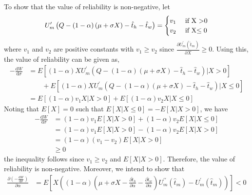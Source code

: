 \documentclass[12pt,a4paper,british]{article}
\makeatletter
\newenvironment{proof}[1][\proofname]{\par
    \normalfont\topsep6\p@\@plus6\p@\relax
    \trivlist
    \itemindent\parindent
    \item[\hskip\labelsep
          \scshape
      #1]\ignorespaces
  }{%
    \endtrivlist\@endpefalse
  }
\providecommand{\proofname}{Proof}
\makeatother
\begin{document}
\begin{proof}
To show that the value of reliability is non-negative, let
\begin{equation*}
U_{m}^{\prime}\left(Q-\left(1-\alpha\right)\left(\mu+\sigma X\right)-\hat{t}_{h}-\hat{t}_{w}\right)=\begin{cases}
v_{1} & \mbox{ if X >0}\\
v_{2} & \mbox{ if X\ensuremath{\leq0}}
\end{cases}
\end{equation*}%
where $v_{1}$ and $v_{2}$ are positive constants with $v_{1}\geq v_{2}$ since $\frac{\partial U_{m}^{\prime}\left(\hat{t}_{m}\right)}{\partial X} \geq 0$. Using this, the value of reliability can be given as,%
\begin{align*}
-\frac{\mathrm{d}W}{\mathrm{d}\sigma} & =E\left[\left(1-\alpha\right)XU_{m}^{\prime}\left(Q-\left(1-\alpha\right)\left(\mu+\sigma X\right)-\hat{t}_{h}-\hat{t}_{w}\right)\vert X>0\right]\\
 & \qquad+E\left[\left(1-\alpha\right)XU_{m}^{\prime}\left(Q-\left(1-\alpha\right)\left(\mu+\sigma X\right)-\hat{t}_{h}-\hat{t}_{w}\right)\vert X\leq0\right]\\
 & =E\left[\left(1-\alpha\right)v_{1}X\vert X>0\right]+E\left[\left(1-\alpha\right)v_{2}X\vert X\leq0\right]
\end{align*}%
Noting that $E\left[X\right]=0$ such that $E\left[X\vert X\leq0\right]=-E\left[X\vert X>0\right]$, we have
\begin{align*}
-\frac{\mathrm{d}W}{\mathrm{d}\sigma} & =\left(1-\alpha\right)v_{1}E\left[X\vert X>0\right]+\left(1-\alpha\right)v_{2}E\left[X\vert X\leq0\right]\\
 & =\left(1-\alpha\right)v_{1}E\left[X\vert X>0\right]-\left(1-\alpha\right)v_{2}E\left[X\vert X>0\right]\\
 & =\left(1-\alpha\right)\left(v_{1}-v_{2}\right)E\left[X\vert X>0\right]\\
 & \geq0
\end{align*}
the inequality follows since $v_{1}\geq v_{2}$ and $E\left[X\vert X>0\right]$. Therefore, the value of reliability is non-negative.
Moreover, we intend to show that
\begin{align*}
\frac{\partial\left(-\frac{\mathrm{d} W} {\mathrm{d} \sigma} \right)} {\partial\alpha} & = E\left[X\left(\left(1-\alpha\right)\left(\mu+\sigma X - \frac{\partial\hat{t}_{h}} {\partial\alpha}-\frac{\partial\hat{t}_{w}} {\partial\alpha} \right) U_{m}^{\prime\prime} \left(\hat{t}_{m} \right) - U_{m}^{\prime}\left( \hat{t}_{m} \right)\right)\right] < 0

\end{align*}
\end{proof}
\end{document}
